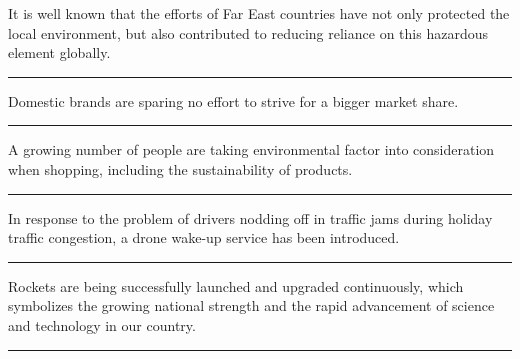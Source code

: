 \documentclass[11pt,a4paper]{article}
\newcommand{\num}[1]{\makebox[1.9em][r]{#1.}\hspace{0.3em}}
\newcommand{\wline}{\noindent\rule{\linewidth}{0.4pt}}
\begin{document}
\begin{minipage}{\linewidth}

\num{4}It is well known that the efforts of Far East countries have not only protected the local environment, but also contributed to reducing reliance on this hazardous element globally.

\vspace{0.25em}

\wline

\end{minipage}

\vspace{0.35em}\vspace{0.15em}

\begin{minipage}{\linewidth}

\num{5}Domestic brands are sparing no effort to strive for a bigger market share.

\vspace{0.25em}

\wline

\end{minipage}

\begin{minipage}{\linewidth}

\num{6}A growing number of people are taking environmental factor into consideration when shopping, including the sustainability of products.

\vspace{0.25em}

\wline

\end{minipage}

\begin{minipage}{\linewidth}

\num{7}In response to the problem of drivers nodding off in traffic jams during holiday traffic congestion, a drone wake-up service has been introduced.

\vspace{0.25em}

\wline

\end{minipage}

\begin{minipage}{\linewidth}

\num{8}Rockets are being successfully launched and upgraded continuously, which symbolizes the growing national strength and the rapid advancement of science and technology in our country.

\vspace{0.25em}

\wline

\end{minipage}
\end{document}
